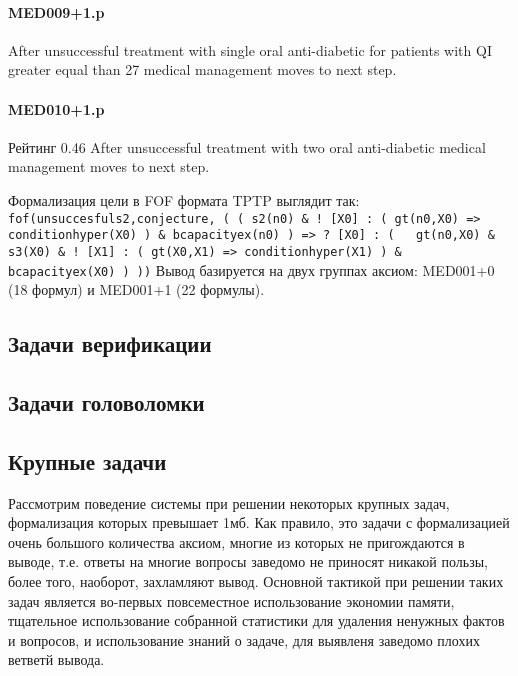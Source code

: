 \paragraph{MED009+1.p}
After unsuccessful treatment with single oral anti-diabetic for patients with QI greater equal than 27 medical management moves to next step.

\paragraph{MED010+1.p}
Рейтинг 0.46
After unsuccessful treatment with two oral anti-diabetic medical management moves to next step.

Формализация цели в FOF формата TPTP выглядит так:
\texttt{fof(unsuccesfuls2,conjecture,
    ( ( s2(n0)
      \& ! [X0] :
          ( gt(n0,X0)
         => conditionhyper(X0) )
      \& bcapacityex(n0) )
   => ? [X0] :
        ( ~ gt(n0,X0)
        \& s3(X0)
        \& ! [X1] :
            ( gt(X0,X1)
           => conditionhyper(X1) )
        \& bcapacityex(X0) ) ))}
Вывод базируется на двух группах аксиом: MED001+0 (18 формул) и MED001+1 (22 формулы).



\subsection{Задачи верификации}


\subsection{Задачи головоломки}



\subsection{Крупные задачи}
Рассмотрим поведение системы при решении некоторых крупных задач, формализация которых превышает 1мб. Как правило, это задачи с формализацией очень большого количества аксиом, многие из которых не пригождаются в выводе, т.е. ответы на многие вопросы заведомо не приносят никакой пользы, более того, наоборот, захламляют вывод. Основной тактикой при решении таких задач является во-первых повсеместное использование экономии памяти, тщательное использование собранной статистики для удаления ненужных фактов и вопросов, и использование знаний о задаче, для выявленя заведомо плохих ветветй вывода.

